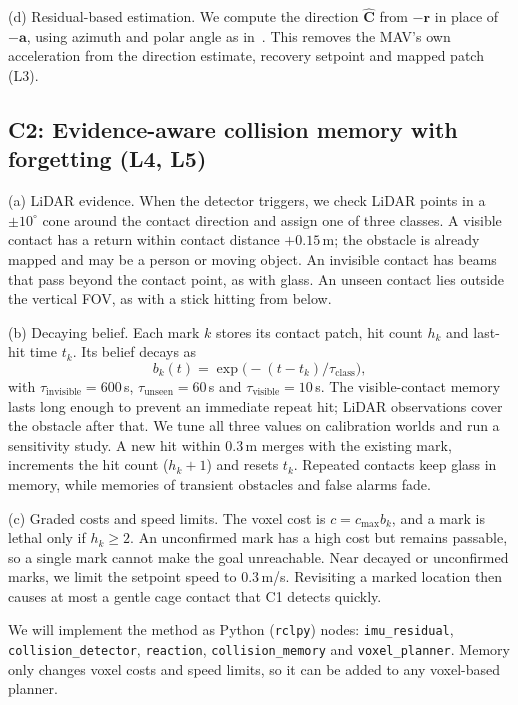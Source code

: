 \documentclass[conference,10pt]{IEEEtran}
\begin{document}
(d) Residual-based estimation. We compute the direction $\hat{\mathbf{C}}$ from $-\mathbf{r}$ in place of $-\mathbf{a}$, using azimuth and polar angle as in~\cite{airbumper}. This removes the MAV's own acceleration from the direction estimate, recovery setpoint and mapped patch (L3).

\subsection{C2: Evidence-aware collision memory with forgetting (L4, L5)}
(a) LiDAR evidence. When the detector triggers, we check LiDAR points in a $\pm10^\circ$ cone around the contact direction and assign one of three classes. A visible contact has a return within contact distance $+0.15$\,m; the obstacle is already mapped and may be a person or moving object. An invisible contact has beams that pass beyond the contact point, as with glass. An unseen contact lies outside the vertical FOV, as with a stick hitting from below.

(b) Decaying belief. Each mark $k$ stores its contact patch, hit count $h_k$ and last-hit time $t_k$. Its belief decays as
\begin{equation}
b_k(t)=\exp\!\big(-(t-t_k)/\tau_{\text{class}}\big),
\end{equation}
with $\tau_{\text{invisible}}=600$\,s, $\tau_{\text{unseen}}=60$\,s and $\tau_{\text{visible}}=10$\,s. The visible-contact memory lasts long enough to prevent an immediate repeat hit; LiDAR observations cover the obstacle after that. We tune all three values on calibration worlds and run a sensitivity study. A new hit within 0.3\,m merges with the existing mark, increments the hit count ($h_k{+}1$) and resets $t_k$. Repeated contacts keep glass in memory, while memories of transient obstacles and false alarms fade.

(c) Graded costs and speed limits. The voxel cost is $c=c_{\max}b_k$, and a mark is lethal only if $h_k\ge2$. An unconfirmed mark has a high cost but remains passable, so a single mark cannot make the goal unreachable. Near decayed or unconfirmed marks, we limit the setpoint speed to 0.3\,m/s. Revisiting a marked location then causes at most a gentle cage contact that C1 detects quickly.

We will implement the method as Python (\texttt{rclpy}) nodes: \texttt{imu\_residual}, \texttt{collision\_detector}, \texttt{reaction}, \texttt{collision\_memory} and \texttt{voxel\_planner}. Memory only changes voxel costs and speed limits, so it can be added to any voxel-based planner.
\end{document}
